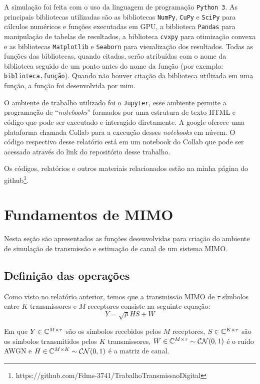 \documentclass{article}
\begin{document}
A simulação foi feita com o uso da linguagem de programação \texttt{Python 3}. As principais bibliotecas utilizadas são as bibliotecas \texttt{NumPy}, \texttt{CuPy} e \texttt{SciPy} para cálculos numéricos e funções executadas em GPU, a biblioteca \texttt{Pandas} para manipulação de tabelas de resultados, a biblioteca \texttt{cvxpy} para otimização convexa e as bibliotecas \texttt{Matplotlib} e \texttt{Seaborn} para visualização dos resultados. Todas as funções das bibliotecas, quando citadas, serão atribuídas com o nome da biblioteca seguido de um ponto antes do nome da função (por exemplo: \texttt{biblioteca.função}). Quando não houver citação da biblioteca utilizada em uma função, a função foi desenvolvida por mim.

O ambiente de trabalho utilizado foi o \texttt{Jupyter}, esse ambiente permite a programação de ``\textit{notebooks}'' formados por uma estrutura de texto HTML e código que pode ser executado e interagido diretamente. A google oferece uma plataforma chamada Collab para a execução desses \textit{notebooks} em núvem. O código respectivo desse relatório está em um notebook do Collab que pode ser acessado através do link do repositório desse trabalho.

Os códigos, relatórios e outros materiais relacionados estão na minha página do github\footnote{https://github.com/Fdms-3741/TrabalhoTransmissaoDigital}.

\section{Fundamentos de MIMO}
\label{sec:fundamentos_mimo}

Nesta seção são apresentados as funções desenvolvidas para criação do ambiente de simulação de transmissão e estimação de canal de um sistema MIMO. 

\subsection{Definição das operações}

Como visto no relatório anterior, temos que a transmissão MIMO de $\tau$ símbolos entre $K$ transmissores e $M$ receptores consiste na seguinte equação:
\begin{equation}
    Y = \sqrt\rho HS + W
    \label{eq:transmissao_mimo}
\end{equation}

Em que $Y\in\mathbb{C}^{M\times\tau}$ são os símbolos recebidos pelos $M$ receptores, $S\in\mathbb{C}^{K\times\tau}$ são os símbolos transmitidos pelos $K$ transmissores, $W\in\mathbb{C}^{M\times\tau}\sim\mathcal{C}\mathcal{N}(0,1)$ é o ruído AWGN e $H\in\mathbb{C}^{M\times K}\sim\mathcal{C}\mathcal{N}(0,1)$ é a matriz de canal. 
\end{document}
